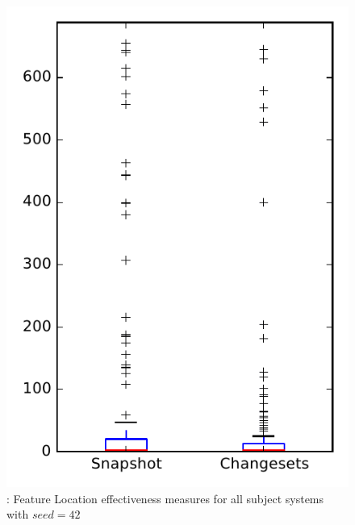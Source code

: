 
\begin{figure}
\centering
\includegraphics[height=0.4\textheight]{figures/flt_seed/rq1_overview_42}
\caption{\rone: Feature Location effectiveness measures for all subject systems with $seed=42$}
\label{fig:flt_seed:rq1:overview}
\end{figure}
